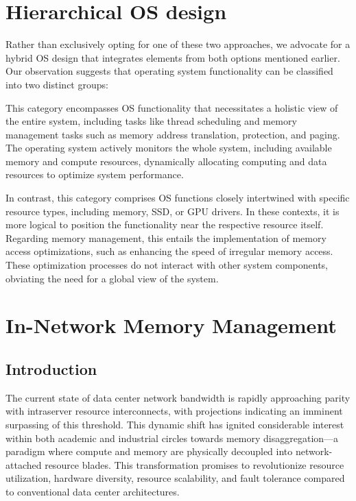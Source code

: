 \section{Hierarchical OS design}

Rather than exclusively opting for one of these two approaches, we advocate for a hybrid OS design that integrates elements from both options mentioned earlier. Our observation suggests that operating system functionality can be classified into two distinct groups:

 This category encompasses OS functionality that necessitates a holistic view of the entire system, including tasks like thread scheduling and memory management tasks such as memory address translation, protection, and paging. The operating system actively monitors the whole system, including available memory and compute resources, dynamically allocating computing and data resources to optimize system performance.

 In contrast, this category comprises OS functions closely intertwined with specific resource types, including memory, SSD, or GPU drivers. In these contexts, it is more logical to position the functionality near the respective resource itself. Regarding memory management, this entails the implementation of memory access optimizations, such as enhancing the speed of irregular memory access. These optimization processes do not interact with other system components, obviating the need for a global view of the system.

\section{In-Network Memory Management}
\subsection{Introduction}
The current state of data center network bandwidth is rapidly approaching parity with intraserver resource interconnects, with projections indicating an imminent surpassing of this threshold. This dynamic shift has ignited considerable interest within both academic and industrial circles towards memory disaggregation—a paradigm where compute and memory are physically decoupled into network-attached resource blades. This transformation promises to revolutionize resource utilization, hardware diversity, resource scalability, and fault tolerance compared to conventional data center architectures.

